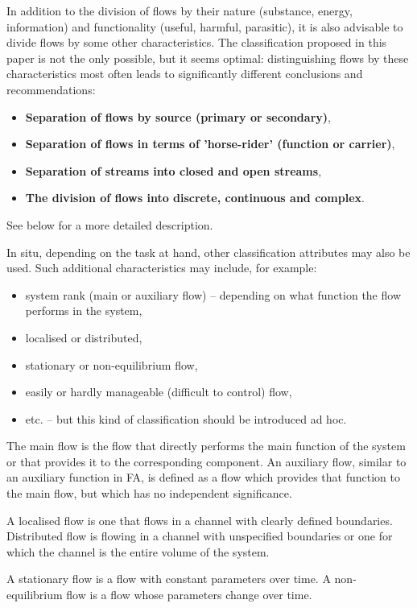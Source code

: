 \documentclass[a4paper,11pt]{article}
\begin{document}
In addition to the division of flows by their nature (substance, energy,
information) and functionality (useful, harmful, parasitic), it is also
advisable to divide flows by some other characteristics. The classification
proposed in this paper is not the only possible, but it seems optimal:
distinguishing flows by these characteristics most often leads to
significantly different conclusions and recommendations:
\begin{itemize}
\item \textbf{Separation of flows by source (primary or secondary)},
\item \textbf{Separation of flows in terms of 'horse-rider' (function or
  carrier)},
\item \textbf{Separation of streams into closed and open streams},
\item \textbf{The division of flows into discrete, continuous and complex}.
\end{itemize}
See below for a more detailed description.

In situ, depending on the task at hand, other classification attributes may
also be used. Such additional characteristics may include, for example:
\begin{itemize}
\item system rank (main or auxiliary flow) -- depending on what function the
  flow performs in the system,
\item localised or distributed,
\item stationary or non-equilibrium flow,
\item easily or hardly manageable (difficult to control) flow,
\item etc. -- but this kind of classification should be introduced ad hoc.
\end{itemize}
The main flow is the flow that directly performs the main function of the
system or that provides it to the corresponding component. An auxiliary flow,
similar to an auxiliary function in FA, is defined as a flow which provides
that function to the main flow, but which has no independent significance.

A localised flow is one that flows in a channel with clearly defined
boundaries. Distributed flow is flowing in a channel with unspecified
boundaries or one for which the channel is the entire volume of the system.

A stationary flow is a flow with constant parameters over time.  A
non-equilibrium flow is a flow whose parameters change over time.
\end{document}

